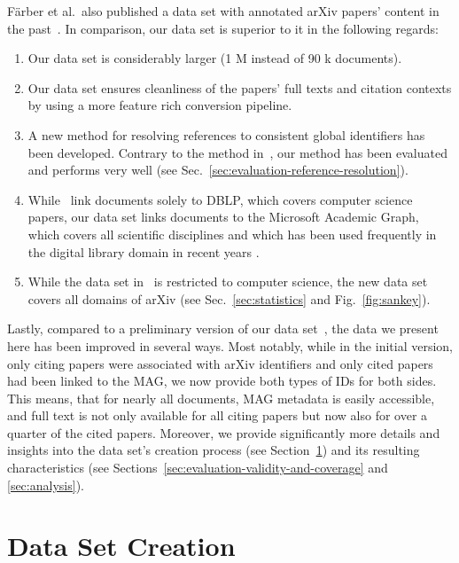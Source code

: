 F{\"{a}}rber et al.\ also published a data set with annotated arXiv papers' content in the past~\cite{Faerber2018LREC}. In comparison, our data set is superior to it in the following regards:
\begin{enumerate}
    \item Our data set is considerably larger (1 M instead of 90 k documents).
    \item Our data set ensures cleanliness of the papers' full texts and citation contexts by using a more feature rich conversion pipeline.
    \item A new method for resolving references to consistent global identifiers has been developed. Contrary to the method in~\cite{Faerber2018LREC}, our method has been evaluated and performs very well (see Sec.~\ref{sec:evaluation-reference-resolution}).
    \item While~\cite{Faerber2018LREC} link documents solely to DBLP, which covers computer science papers, our data set links documents to the Microsoft Academic Graph, which covers all scientific disciplines and which has been used frequently in the digital library domain in recent years \cite{Mohapatra2019}.
    \item While the data set in~\cite{Faerber2018LREC} is restricted to computer science, the new data set covers all domains of arXiv (see Sec.~\ref{sec:statistics} and Fig.~\ref{fig:sankey}).
\end{enumerate}

Lastly, compared to a preliminary version of our data set~\cite{Saier2019}, the data we present here has been improved in several ways. Most notably, while in the initial version, only citing papers were associated with arXiv identifiers and only cited papers had been linked to the MAG, we now provide both types of IDs for both sides. This means, that for nearly all documents, MAG metadata is easily accessible, and full text is not only available for all citing papers but now also for over a quarter of the cited papers. Moreover, we provide significantly more details and insights into the data set's creation process (see Section~\ref{sec:data-set-creation}) and its resulting characteristics (see Sections~\ref{sec:evaluation-validity-and-coverage} and \ref{sec:analysis}).



\section{Data Set Creation}
\label{sec:data-set-creation}

